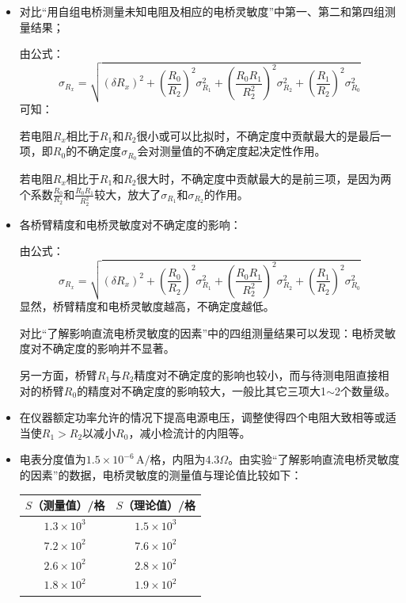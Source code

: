 \documentclass[a4paper]{ctexbook}
\begin{document}
\begin{itemize}
    \item[1.] 对比“用自组电桥测量未知电阻及相应的电桥灵敏度”中第一、第二和第四组测量结果；

    由公式：
    \[\sigma_{R_x} = \sqrt{(\delta R_x)^2+\left(\frac{R_0}{R_2}\right)^2\sigma_{R_1}^2+\left(\frac{R_0R_1}{R_2^2}\right)^2\sigma_{R_2}^2+\left(\frac{R_1}{R_2}\right)^2\sigma_{R_0}^2}\]
    可知：

    若电阻$R_x$相比于$R_1$和$R_2$很小或可以比拟时，不确定度中贡献最大的是最后一项，即$R_0$的不确定度$\sigma_{R_0}$会对测量值的不确定度起决定性作用。

    若电阻$R_x$相比于$R_1$和$R_2$很大时，不确定度中贡献最大的是前三项，是因为两个系数$\frac{R_0}{R_2}$和$\frac{R_0R_1}{R_2^2}$较大，放大了$\sigma_{R_1}$和$\sigma_{R_2}$的作用。

    \medskip
    \item[2.] 各桥臂精度和电桥灵敏度对不确定度的影响：

    由公式：
    \[
    \sigma_{R_x} = \sqrt{(\delta R_x)^2+\left(\frac{R_0}{R_2}\right)^2\sigma_{R_1}^2+\left(\frac{R_0R_1}{R_2^2}\right)^2\sigma_{R_2}^2+\left(\frac{R_1}{R_2}\right)^2\sigma_{R_0}^2}
    \]
    显然，桥臂精度和电桥灵敏度越高，不确定度越低。

    对比“了解影响直流电桥灵敏度的因素”中的四组测量结果可以发现：电桥灵敏度对不确定度的影响并不显著。

    另一方面，桥臂$R_1$与$R_2$精度对不确定度的影响也较小，而与待测电阻直接相对的桥臂$R_0$的精度对不确定度的影响较大，一般比其它三项大1$\sim$2个数量级。

    \medskip
    \item[3.] 在仪器额定功率允许的情况下提高电源电压，调整使得四个电阻大致相等或适当使$R_1>R_2$以减小$R_0$，减小检流计的内阻等。

    \medskip
    \item[4.] 电表分度值为$1.5\times10^{-6}\,\text{A/格}$，内阻为$4.3\Omega$。由实验“了解影响直流电桥灵敏度的因素”的数据，电桥灵敏度的测量值与理论值比较如下：

    \begin{table}[ht!]
    \begin{center}
        \begin{tabular}{|c|c|}
            \hline
            $S$（测量值）/格 & $S$（理论值）/格 \\
            \hline
            $1.3\times10^3$ & $1.5\times10^3$ \\
            \hline
            $7.2\times10^2$ & $7.6\times10^2$ \\
            \hline
            $2.6\times10^2$ & $2.8\times10^2$ \\
            \hline
            $1.8\times10^2$ & $1.9\times10^2$ \\
            \hline
        \end{tabular}
    \end{center}
    \end{table}


\end{itemize}
\end{document}
